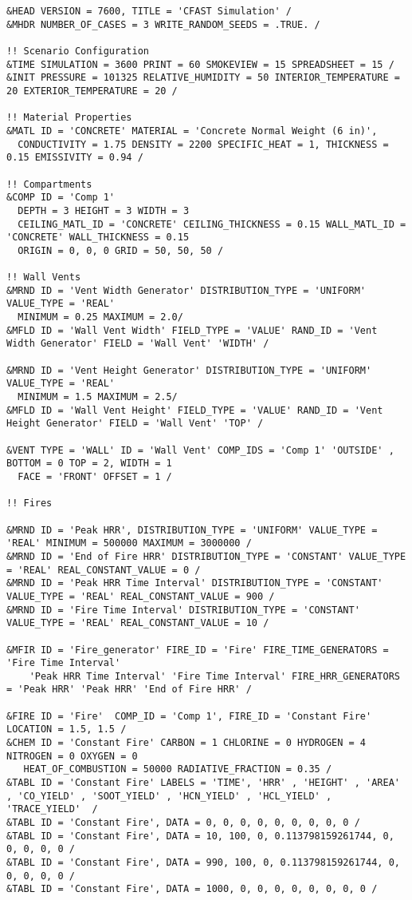 \begin{lstlisting}[basicstyle=\tiny]
&HEAD VERSION = 7600, TITLE = 'CFAST Simulation' /
&MHDR NUMBER_OF_CASES = 3 WRITE_RANDOM_SEEDS = .TRUE. /

!! Scenario Configuration
&TIME SIMULATION = 3600 PRINT = 60 SMOKEVIEW = 15 SPREADSHEET = 15 /
&INIT PRESSURE = 101325 RELATIVE_HUMIDITY = 50 INTERIOR_TEMPERATURE = 20 EXTERIOR_TEMPERATURE = 20 /

!! Material Properties
&MATL ID = 'CONCRETE' MATERIAL = 'Concrete Normal Weight (6 in)',
  CONDUCTIVITY = 1.75 DENSITY = 2200 SPECIFIC_HEAT = 1, THICKNESS = 0.15 EMISSIVITY = 0.94 /

!! Compartments
&COMP ID = 'Comp 1'
  DEPTH = 3 HEIGHT = 3 WIDTH = 3
  CEILING_MATL_ID = 'CONCRETE' CEILING_THICKNESS = 0.15 WALL_MATL_ID = 'CONCRETE' WALL_THICKNESS = 0.15
  ORIGIN = 0, 0, 0 GRID = 50, 50, 50 /

!! Wall Vents
&MRND ID = 'Vent Width Generator' DISTRIBUTION_TYPE = 'UNIFORM' VALUE_TYPE = 'REAL'
  MINIMUM = 0.25 MAXIMUM = 2.0/
&MFLD ID = 'Wall Vent Width' FIELD_TYPE = 'VALUE' RAND_ID = 'Vent Width Generator' FIELD = 'Wall Vent' 'WIDTH' /

&MRND ID = 'Vent Height Generator' DISTRIBUTION_TYPE = 'UNIFORM' VALUE_TYPE = 'REAL'
  MINIMUM = 1.5 MAXIMUM = 2.5/
&MFLD ID = 'Wall Vent Height' FIELD_TYPE = 'VALUE' RAND_ID = 'Vent Height Generator' FIELD = 'Wall Vent' 'TOP' /

&VENT TYPE = 'WALL' ID = 'Wall Vent' COMP_IDS = 'Comp 1' 'OUTSIDE' , BOTTOM = 0 TOP = 2, WIDTH = 1
  FACE = 'FRONT' OFFSET = 1 /

!! Fires

&MRND ID = 'Peak HRR', DISTRIBUTION_TYPE = 'UNIFORM' VALUE_TYPE = 'REAL' MINIMUM = 500000 MAXIMUM = 3000000 /
&MRND ID = 'End of Fire HRR' DISTRIBUTION_TYPE = 'CONSTANT' VALUE_TYPE = 'REAL' REAL_CONSTANT_VALUE = 0 /
&MRND ID = 'Peak HRR Time Interval' DISTRIBUTION_TYPE = 'CONSTANT' VALUE_TYPE = 'REAL' REAL_CONSTANT_VALUE = 900 /
&MRND ID = 'Fire Time Interval' DISTRIBUTION_TYPE = 'CONSTANT' VALUE_TYPE = 'REAL' REAL_CONSTANT_VALUE = 10 /

&MFIR ID = 'Fire_generator' FIRE_ID = 'Fire' FIRE_TIME_GENERATORS = 'Fire Time Interval'
    'Peak HRR Time Interval' 'Fire Time Interval' FIRE_HRR_GENERATORS = 'Peak HRR' 'Peak HRR' 'End of Fire HRR' /

&FIRE ID = 'Fire'  COMP_ID = 'Comp 1', FIRE_ID = 'Constant Fire'  LOCATION = 1.5, 1.5 /
&CHEM ID = 'Constant Fire' CARBON = 1 CHLORINE = 0 HYDROGEN = 4 NITROGEN = 0 OXYGEN = 0
   HEAT_OF_COMBUSTION = 50000 RADIATIVE_FRACTION = 0.35 /
&TABL ID = 'Constant Fire' LABELS = 'TIME', 'HRR' , 'HEIGHT' , 'AREA' , 'CO_YIELD' , 'SOOT_YIELD' , 'HCN_YIELD' , 'HCL_YIELD' , 'TRACE_YIELD'  /
&TABL ID = 'Constant Fire', DATA = 0, 0, 0, 0, 0, 0, 0, 0, 0 /
&TABL ID = 'Constant Fire', DATA = 10, 100, 0, 0.113798159261744, 0, 0, 0, 0, 0 /
&TABL ID = 'Constant Fire', DATA = 990, 100, 0, 0.113798159261744, 0, 0, 0, 0, 0 /
&TABL ID = 'Constant Fire', DATA = 1000, 0, 0, 0, 0, 0, 0, 0, 0 /


\end{lstlisting}
